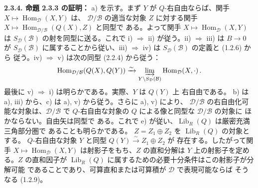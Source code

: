 \medskip\noindent\textbf{2.3.4. 命題 2.3.3 の証明：}\quad
{}
a) を示す。まず $Y$ が $Q$-右自由ならば、関手
$X\longmapsto\operatorname{Hom}_{\mathcal D}(X,Y)$ は、
$\mathcal D/\mathcal B$ の適当な対象 $Z$ に対する関手
$X\longmapsto\operatorname{Hom}_{\mathcal D/\mathcal B}(Q(X),Z)$ と同型で
ある。よって関手 $X\longmapsto\operatorname{Hom}_{\mathcal D}(X,Y)$ は
$S_{\mathcal D}(\mathcal B)$ の射を同型に送る。これで
i) $\Rightarrow$ ii) が従う。ii) $\Rightarrow$ iii) は
$B\longrightarrow0$ が $S_{\mathcal D}(\mathcal B)$ に属することから従い、iii)
$\Rightarrow$ iv) は $S_{\mathcal D}(\mathcal B)$ の定義と (1.2.6) から
従う。iv) $\Rightarrow$ v) は次の同型 (2.2.4) から従う：
\[
  \operatorname{Hom}_{\mathcal D/\mathcal B}(Q(X),Q(Y))
  \xrightarrow{\sim}
  \varinjlim_{Y\backslash S_{\mathcal D}(\mathcal B)}
  \operatorname{Hom}_{\mathcal D}(X,\mathord\cdot)\, .
\]
最後に v) $\Rightarrow$ i) は明らかである。実際、$Y$ は $Q(Y)$ 上
右自由である。
b) は a), iii) から、c) は a), v) から従う。さらに a), v) により、
$\mathcal D/\mathcal B$ の右自由化可能な対象は、$\mathcal D/\mathcal B$ で
$Q$-右自由な対象の $Q$ による像と同型な $\mathcal D/\mathcal B$ の対象に
ほかならない。自由矢は同型で
ある。これで e) が従い、$\operatorname{Lib}_R(Q)$ は厳密充満三角部分圏で
あることも明らかである。
$Z=Z_1\oplus Z_2$ を $\operatorname{Lib}_R(Q)$ の対象とする。
$Q$-右自由な対象 $Y$ と同型 $Q(Y)\xrightarrow{\sim}Z_1\oplus Z_2$ が
存在する。したがって関手 $X\longmapsto\operatorname{Hom}_{\mathcal D}(X,Y)$
は射影子をもち、$Z$ の直和分解は $Y$ 上の射影子を定める。$Z$ の直和因子が
$\operatorname{Lib}_R(Q)$ に属するための必要十分条件はこの射影子が分解可能
であることであり、可算直和または可算積が $\mathcal D$ で表現可能ならば
そうなる (1.2.9)。
\endgroup
